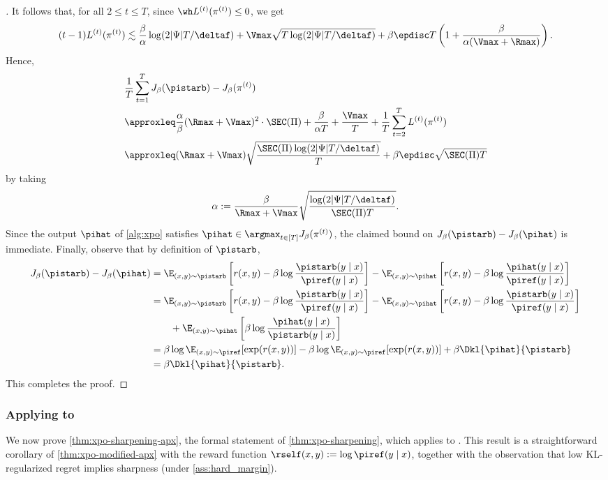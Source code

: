 \begin{proof}[]
It follows that, for all $2 \leq t \leq T$, since $\wh L^{(t)}(\pi^{(t)}) \leq 0$, we get
\[(t-1)L^{(t)}(\pi^{(t)}) \lesssim \frac{\beta}{\alpha} \log(2|\Psi|T/\deltaf) + \Vmax\sqrt{T\log(2|\Psi|T/\deltaf)} + \beta\epdisc T\left(1 + \frac{\beta}{\alpha(\Vmax+\Rmax)}\right).\]
Hence,
\begin{align}
&\frac{1}{T}\sum_{t=1}^T J_\beta(\pistarb) - J_\beta(\pi^{(t)}) \\ 
&\approxleq \frac{\alpha}{\beta} (\Rmax+\Vmax)^2 \cdot \SEC(\Pi) + \frac{\beta}{\alpha T} + \frac{\Vmax}{T} + \frac{1}{T}\sum_{t=2}^T L^{(t)}(\pi^{(t)}) \\ 
&\approxleq (\Rmax+\Vmax) \sqrt{\frac{\SEC(\Pi)\log(2|\Psi|T/\deltaf)}{T}} + \beta\epdisc \sqrt{\SEC(\Pi)T}
\end{align}
by taking
\[\alpha := \frac{\beta}{\Rmax+\Vmax} \sqrt{\frac{\log(2|\Psi|T/\deltaf)}{\SEC(\Pi) T}}.\]
Since the output $\pihat$ of \cref{alg:xpo} satisfies $\pihat \in \argmax_{t \in [T]} J_\beta(\pi^{(t)})$, the claimed bound on $J_\beta(\pistarb) - J_\beta(\pihat)$ is immediate. Finally, observe that by definition of $\pistarb$,
\begin{align}
J_\beta(\pistarb) - J_\beta(\pihat)
&= \E_{(x,y) \sim \pistarb}\left[r(x,y) - \beta \log \frac{\pistarb(y\mid x)}{\piref(y\mid x)}\right] - \E_{(x,y) \sim \pihat}\left[r(x,y) - \beta \log \frac{\pihat(y\mid x)}{\piref(y\mid x)}\right] \\
&= \E_{(x,y) \sim \pistarb}\left[r(x,y) - \beta \log \frac{\pistarb(y\mid x)}{\piref(y\mid x)}\right] - \E_{(x,y) \sim \pihat}\left[r(x,y) - \beta \log \frac{\pistarb(y\mid x)}{\piref(y\mid x)}\right] \\
&\qquad+ \E_{(x,y) \sim \pihat}\left[\beta \log \frac{\pihat(y\mid x)}{\pistarb(y\mid x)}\right] \\
&= \beta \log \E_{(x,y) \sim \piref} [\exp(r(x,y))] - \beta \log \E_{(x,y) \sim \piref} [\exp(r(x,y))] + \beta\Dkl{\pihat}{\pistarb} \\ 
&= \beta\Dkl{\pihat}{\pistarb}.
\end{align}
This completes the proof.
\end{proof}

\subsubsection{Applying \xpo to \mlsharp}
\label{sec:xpo_sharpening}

We now prove \cref{thm:xpo-sharpening-apx}, the formal statement of
\cref{thm:xpo-sharpening}, which applies \xpo to \mlsharp. This result
is a straightforward corollary of \cref{thm:xpo-modified-apx} with the reward function $\rself(x,y) := \log \piref(y \mid x)$, together with the observation that low KL-regularized regret implies sharpness (under \cref{ass:hard_margin}).

